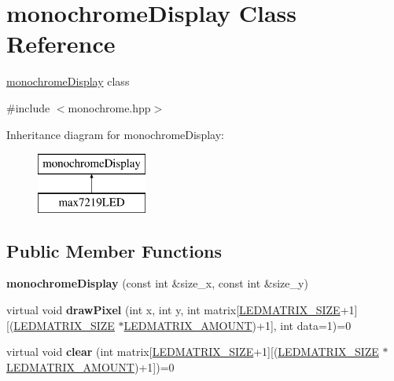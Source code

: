 \hypertarget{classmonochrome_display}{}\section{monochrome\+Display Class Reference}
\label{classmonochrome_display}


\hyperlink{classmonochrome_display}{monochrome\+Display} class  




{\ttfamily \#include $<$monochrome.\+hpp$>$}

Inheritance diagram for monochrome\+Display\+:\begin{figure}[H]
\begin{center}
\leavevmode
\includegraphics[height=2.000000cm]{classmonochrome_display}
\end{center}
\end{figure}
\subsection*{Public Member Functions}
\begin{DoxyCompactItemize}
\item 
{\bfseries monochrome\+Display} (const int \&size\+\_\+x, const int \&size\+\_\+y)\hypertarget{classmonochrome_display_afdfb66cfcaca269751ff2db466335055}{}\label{classmonochrome_display_afdfb66cfcaca269751ff2db466335055}

\item 
virtual void {\bfseries draw\+Pixel} (int x, int y, int matrix\mbox{[}\hyperlink{max7219_l_e_dconstants_8hpp_a2a4cf20d00f170bb1778318f645ab6cb}{L\+E\+D\+M\+A\+T\+R\+I\+X\+\_\+\+S\+I\+ZE}+1\mbox{]}\mbox{[}(\hyperlink{max7219_l_e_dconstants_8hpp_a2a4cf20d00f170bb1778318f645ab6cb}{L\+E\+D\+M\+A\+T\+R\+I\+X\+\_\+\+S\+I\+ZE} $\ast$\hyperlink{max7219_l_e_dconstants_8hpp_aa3f1c3f51823e34beb0682e7f799793b}{L\+E\+D\+M\+A\+T\+R\+I\+X\+\_\+\+A\+M\+O\+U\+NT})+1\mbox{]}, int data=1)=0\hypertarget{classmonochrome_display_ae0d92a60755a2924799e04382f41f1f0}{}\label{classmonochrome_display_ae0d92a60755a2924799e04382f41f1f0}

\item 
virtual void {\bfseries clear} (int matrix\mbox{[}\hyperlink{max7219_l_e_dconstants_8hpp_a2a4cf20d00f170bb1778318f645ab6cb}{L\+E\+D\+M\+A\+T\+R\+I\+X\+\_\+\+S\+I\+ZE}+1\mbox{]}\mbox{[}(\hyperlink{max7219_l_e_dconstants_8hpp_a2a4cf20d00f170bb1778318f645ab6cb}{L\+E\+D\+M\+A\+T\+R\+I\+X\+\_\+\+S\+I\+ZE} $\ast$\hyperlink{max7219_l_e_dconstants_8hpp_aa3f1c3f51823e34beb0682e7f799793b}{L\+E\+D\+M\+A\+T\+R\+I\+X\+\_\+\+A\+M\+O\+U\+NT})+1\mbox{]})=0\hypertarget{classmonochrome_display_a4cc51ac0de3ff1dc880df4308b9ab056}{}\label{classmonochrome_display_a4cc51ac0de3ff1dc880df4308b9ab056}

\end{DoxyCompactItemize}
